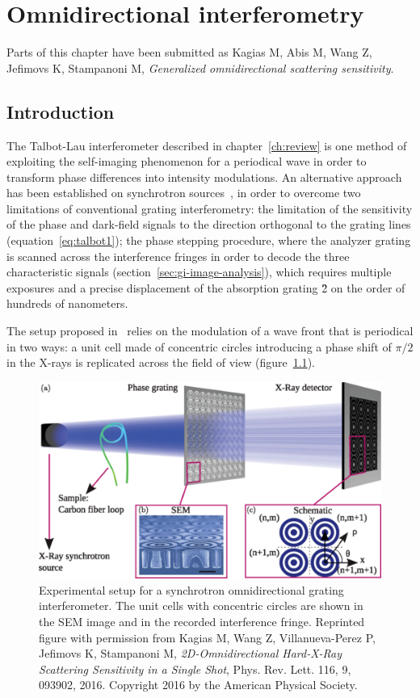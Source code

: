 \chapter{Omnidirectional interferometry}\label{ch:omnidirectional}
Parts of this chapter have been submitted as Kagias M, Abis M, Wang Z,
Jefimovs K, Stampanoni M,
\emph{Generalized omnidirectional scattering sensitivity}.

\section{Introduction}
The Talbot-Lau interferometer described in chapter~\ref{ch:review} is one
method of exploiting the self-imaging phenomenon for a periodical wave in
order to transform phase differences into intensity modulations.
An alternative approach has been established on synchrotron
sources~\cite{PhysRevLett.116.093902}, in order to overcome two limitations
of conventional grating interferometry: the limitation of the sensitivity of
the phase and dark-field signals to the direction orthogonal to the grating
lines (equation~\ref{eq:talbot1}); the phase stepping procedure, where
the analyzer grating is scanned across the interference fringes in order to
decode the three characteristic signals
(section~\ref{sec:gi-image-analysis}), which requires multiple exposures and
a precise displacement of the absorption grating \G2 on the order of
hundreds of nanometers.

The setup proposed in~\cite{PhysRevLett.116.093902} relies on the modulation
of a wave front that is periodical in two ways: a unit cell made of
concentric circles introducing a phase shift of $\pi/2$ in the X-rays is
replicated across the field of view
(figure~\ref{fig:omnidirectional-synchrotron}).

\begin{figure}[htb]
    \centering
    \includegraphics[width=\textwidth]{gfx/omnidirectional/synchrotron-design.png}
    \caption{Experimental setup for a synchrotron omnidirectional grating
    interferometer. The unit cells with concentric circles are shown in the
    \ac{SEM} image and in the recorded interference fringe. Reprinted figure
with permission from Kagias M, Wang Z, Villanueva-Perez P, Jefimovs K,
Stampanoni M, \emph{2D-Omnidirectional Hard-X-Ray Scattering Sensitivity in
a Single Shot}, Phys. Rev. Lett. 116, 9, 093902, 2016. Copyright 2016 by the
American Physical Society.}
    \label{fig:omnidirectional-synchrotron}
\end{figure}


